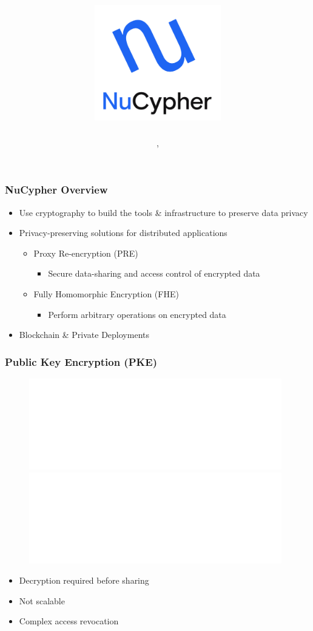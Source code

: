 \documentclass[xetex,mathsans,sans,aspectratio=169]{beamer}
\title[\titlefooter]{\includegraphics[width=5.5cm]{pdf/nucypher_logo.pdf}}
\author[\presenterfooter]{\presenter}
\date[\eventdate]{\event, \eventdate}
\begin{document}
    \begin{frame}
        \titlepage
    \end{frame}

    \begin{frame}
      \frametitle{NuCypher Overview}
        \begin{itemize}
          \setlength\itemsep{1em}
            \item Use cryptography to build the tools \& infrastructure to preserve data privacy
            \item Privacy-preserving solutions for distributed applications
              \begin{itemize}
                  \item Proxy Re-encryption (PRE)
                  \begin{itemize}
                    \item Secure data-sharing and access control of encrypted data
                  \end{itemize}
                  \item Fully Homomorphic Encryption (FHE)
                  \begin{itemize}
                    \item Perform arbitrary operations on encrypted data
                  \end{itemize}
              \end{itemize}
            \item Blockchain \& Private Deployments
        \end{itemize}
    \end{frame}

    \begin{frame}
        \frametitle{Public Key Encryption (PKE)}
        \begin{figure}
            \centering
            \includegraphics<1>[width=11cm]{pdf/pke-multi.pdf}
            \includegraphics<2>[width=11cm]{pdf/pke-multi-hack.pdf}
        \end{figure}

        \begin{itemize}
            \item<2> Decryption required before sharing
            \item<2> Not scalable
            \item<2> Complex access revocation
        \end{itemize}
    \end{frame}
\end{document}
